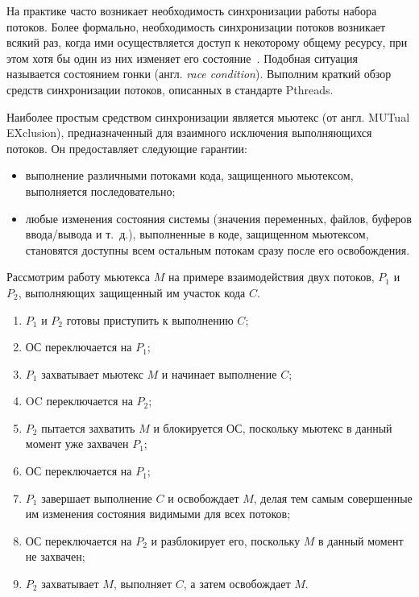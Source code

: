 На практике часто возникает необходимость синхронизации работы набора потоков.
Более формально, необходимость синхронизации потоков возникает всякий раз,
когда ими осуществляется доступ к некоторому общему ресурсу,
при этом хотя бы один из них изменяет его состояние~\cite{Tanenbaum:2007:MOS:1410217}.
Подобная ситуация называется состоянием гонки (англ. \textit{race condition}).
Выполним краткий обзор средств синхронизации потоков, описанных в стандарте Pthreads.

Наиболее простым средством синхронизации является мьютекс (от англ. MUTual EXclusion),
предназначенный для взаимного исключения выполняющихся потоков.
Он предоставляет следующие гарантии:
\begin{itemize}
  \item выполнение различными потоками кода, защищенного мьютексом,
    выполняется последовательно;
  \item любые изменения состояния системы (значения переменных, файлов,
    буферов ввода/вывода и т.~д.),
    выполненные в коде, защищенном мьютексом, становятся доступны всем
    остальным потокам сразу после его освобождения.
\end{itemize}
\pagebreak

Рассмотрим работу мьютекса \( M \) на примере взаимодействия двух потоков,
\( P_1 \) и \( P_2 \), выполняющих защищенный им участок кода \( C \).
\begin{enumerate}
\item \( P_1 \) и \( P_2 \) готовы приступить к выполнению \( C \);
\item ОС переключается на \( P_1 \);
\item \( P_1 \) захватывает мьютекс \( M \) и начинает выполнение \( C \);
\item OC переключается на \( P_2 \);
\item \( P_2 \) пытается захватить \( M \) и блокируется ОС,
  поскольку мьютекс в данный момент уже захвачен \( P_1 \);
\item ОС переключается на \( P_1 \);
\item \( P_1 \) завершает выполнение \( C \) и освобождает \( M \),
  делая тем самым совершенные им изменения состояния видимыми для всех потоков;
\item ОС переключается на \( P_2 \) и разблокирует его, поскольку \( M \)
  в данный момент не захвачен;
\item \( P_2 \) захватывает \( M \), выполняет \( C \), а затем освобождает \( M \).
\end{enumerate}

